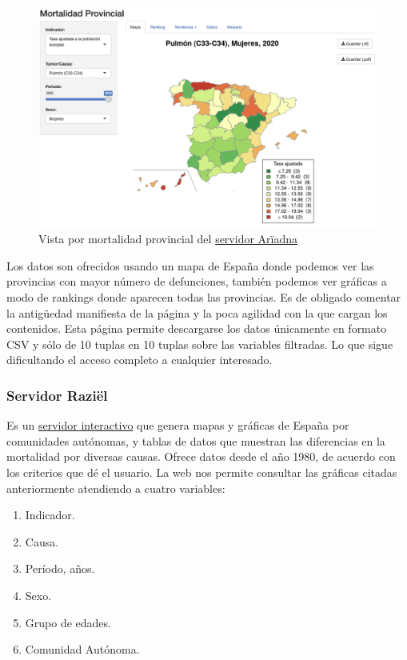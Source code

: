 \begin{figure}[]
	\centering
	\includegraphics[scale=0.3]{doc/logos/imgs/ariadna2.png}
	\caption{ Vista por mortalidad provincial del \href{http://ariadna.cne.isciii.es/}{servidor Arïadna} }
    \label{fig:worst_f_value}
\end{figure}
\FloatBarrier 

Los datos son ofrecidos usando un mapa de España donde podemos ver las provincias con 
mayor número de defunciones, también podemos ver gráficas a modo de rankings donde
aparecen todas las provincias. Es de obligado comentar la antigüedad manifiesta de la página y la poca
agilidad con la que cargan los contenidos. Esta página permite descargarse los datos
únicamente en formato CSV y sólo de 10 tuplas en 10 tuplas sobre las  variables filtradas.
Lo que sigue dificultando el acceso completo a cualquier interesado.

\subsubsection{Servidor Raziël}
Es un \href{http://raziel.cne.isciii.es/index.php}{servidor interactivo} que genera
mapas y gráficas de España por comunidades autónomas, y tablas de datos que muestran las
diferencias en la mortalidad por diversas causas. Ofrece datos desde el año 1980, de
acuerdo con los criterios que dé el usuario. La web nos permite consultar las gráficas
citadas anteriormente atendiendo a cuatro variables:
\begin{enumerate}
    \item Indicador.
    \item Causa.
    \item Período, años.
    \item Sexo.
    \item Grupo de edades.
    \item Comunidad Autónoma.
\end{enumerate}

